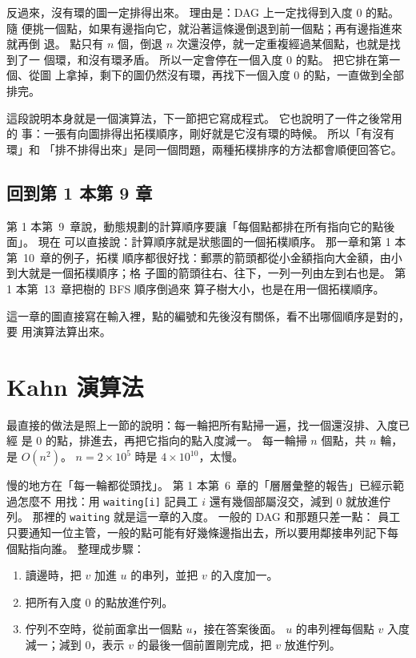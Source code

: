 反過來，沒有環的圖一定排得出來。 理由是：DAG 上一定找得到入度 $0$ 的點。 隨
便挑一個點，如果有邊指向它，就沿著這條邊倒退到前一個點；再有邊指進來就再倒
退。 點只有 $n$ 個，倒退 $n$ 次還沒停，就一定重複經過某個點，也就是找到了一
個環，和沒有環矛盾。 所以一定會停在一個入度 $0$ 的點。 把它排在第一個、從圖
上拿掉，剩下的圖仍然沒有環，再找下一個入度 $0$ 的點，一直做到全部排完。

這段說明本身就是一個演算法，下一節把它寫成程式。 它也說明了一件之後常用的
事：一張有向圖排得出拓樸順序，剛好就是它沒有環的時候。 所以「有沒有環」和
「排不排得出來」是同一個問題，兩種拓樸排序的方法都會順便回答它。

\subsection{回到第 1 本第 9 章}

第 1 本第~9~章說，動態規劃的計算順序要讓「每個點都排在所有指向它的點後面」。 現在
可以直接說：計算順序就是狀態圖的一個拓樸順序。 那一章和第 1 本第~10~章的例子，拓樸
順序都很好找：郵票的箭頭都從小金額指向大金額，由小到大就是一個拓樸順序；格
子圖的箭頭往右、往下，一列一列由左到右也是。 第 1 本第~13~章把樹的 BFS 順序倒過來
算子樹大小，也是在用一個拓樸順序。

這一章的圖直接寫在輸入裡，點的編號和先後沒有關係，看不出哪個順序是對的，要
用演算法算出來。

\section{Kahn 演算法}
\label{sec:kahn}

最直接的做法是照上一節的說明：每一輪把所有點掃一遍，找一個還沒排、入度已經
是 $0$ 的點，排進去，再把它指向的點入度減一。 每一輪掃 $n$ 個點，共 $n$ 輪，
是 $O(n^2)$。 $n = 2 \times 10^5$ 時是 $4 \times 10^{10}$，太慢。

慢的地方在「每一輪都從頭找」。 第 1 本第~6~章的「層層彙整的報告」已經示範過怎麼不
用找：用 \texttt{waiting[i]} 記員工 $i$ 還有幾個部屬沒交，減到 $0$ 就放進佇
列。 那裡的 \texttt{waiting} 就是這一章的入度。 一般的 DAG 和那題只差一點：
員工只要通知一位主管，一般的點可能有好幾條邊指出去，所以要用鄰接串列記下每
個點指向誰。 整理成步驟：

\begin{enumerate}
\item 讀邊時，把 $v$ 加進 $u$ 的串列，並把 $v$ 的入度加一。
\item 把所有入度 $0$ 的點放進佇列。
\item 佇列不空時，從前面拿出一個點 $u$，接在答案後面。 $u$ 的串列裡每個點
$v$ 入度減一；減到 $0$，表示 $v$ 的最後一個前置剛完成，把 $v$ 放進佇列。
\end{enumerate}

